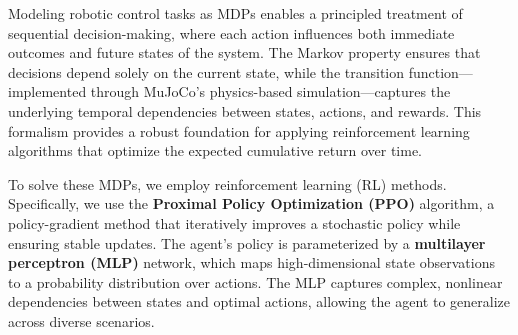 \documentclass[english, 12pt, a4paper, elec, utf8, a-2b, online]{aaltothesis}
\begin{document}
Modeling robotic control tasks as MDPs enables a principled treatment of sequential decision-making, where each action influences both immediate outcomes and future states of the system. The Markov property ensures that decisions depend solely on the current state, while the transition function---implemented through MuJoCo’s physics-based simulation---captures the underlying temporal dependencies between states, actions, and rewards. This formalism provides a robust foundation for applying reinforcement learning algorithms that optimize the expected cumulative return over time.

To solve these MDPs, we employ reinforcement learning (RL) methods. Specifically, we use the \textbf{Proximal Policy Optimization (PPO)} algorithm, a policy-gradient method that iteratively improves a stochastic policy while ensuring stable updates. The agent’s policy is parameterized by a \textbf{multilayer perceptron (MLP)} network, which maps high-dimensional state observations to a probability distribution over actions. The MLP captures complex, nonlinear dependencies between states and optimal actions, allowing the agent to generalize across diverse scenarios.
\end{document}
